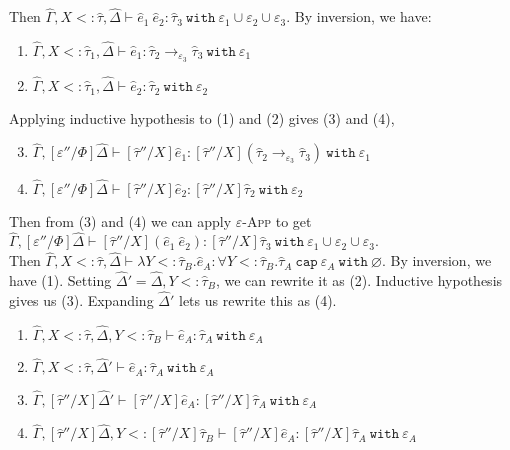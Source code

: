 \documentclass{llncs}
\newcommand{\keywadj}[1]{\mathtt{#1}}
\newcommand{\keyw}[1]{\keywadj{#1}~}
\newcommand{\kw}[1]{\keyw{ #1 }}
\begin{document}
 Then $\hat \Gamma, X <: \hat \tau, \hat \Delta \vdash \hat e_1~\hat e_2: \hat \tau_3~\kw{with} \varepsilon_1 \cup \varepsilon_2 \cup \varepsilon_3$. By inversion, we have:

\begin{enumerate}
	\item $\hat \Gamma, X <: \hat \tau_1, \hat \Delta \vdash \hat e_1: \hat \tau_2 \rightarrow_{\varepsilon_3} \hat \tau_3~\kw{with} \varepsilon_1$
	\item $\hat \Gamma, X <: \hat \tau_1, \hat \Delta \vdash \hat e_2: \hat \tau_2~\kw{with} \varepsilon_2$
\end{enumerate}

Applying inductive hypothesis to (1) and (2) gives (3) and (4),

\begin{enumerate}
	\setcounter{enumi}{2}
	\item $\hat \Gamma, [\varepsilon''/\Phi]\hat \Delta \vdash [\hat \tau''/X]\hat e_1: [\hat \tau''/X](\hat \tau_2 \rightarrow_{\varepsilon_3} \hat \tau_3)~\kw{with} \varepsilon_1$
	\item $\hat \Gamma, [\varepsilon''/\Phi]\hat \Delta \vdash [\hat \tau''/X]\hat e_2:  [\hat \tau''/X]\hat \tau_2~\kw{with} \varepsilon_2$
\end{enumerate}

Then from (3) and (4) we can apply \textsc{$\varepsilon$-App} to get $\hat \Gamma, [\varepsilon''/\Phi]\hat \Delta \vdash [\hat \tau''/X](\hat e_1~\hat e_2) : [\hat \tau''/X]\hat \tau_3~\kw{with} \varepsilon_1 \cup \varepsilon_2 \cup \varepsilon_3$. \\

 Then $\hat \Gamma, X <: \hat \tau, \hat \Delta \vdash \lambda Y <: \hat \tau_B. \hat e_A: \forall Y <: \hat \tau_B. \hat \tau_A~\kw{cap} \varepsilon_A~\kw{with} \varnothing$. By inversion, we have (1). Setting $\hat \Delta' = \hat \Delta, Y <: \hat \tau_B$, we can rewrite it as (2). Inductive hypothesis gives us (3). Expanding $\hat \Delta'$ lets us rewrite this as (4).

\begin{enumerate}
	\item $\hat \Gamma, X <: \hat \tau, \hat \Delta, Y <: \hat \tau_B \vdash \hat e_A: \hat \tau_A~\kw{with} \varepsilon_A$ 
	\item $\hat \Gamma, X <: \hat \tau, \hat \Delta' \vdash \hat e_A: \hat \tau_A~\kw{with} \varepsilon_A$
	\item $\hat \Gamma, [\hat \tau''/X]\hat \Delta' \vdash [\hat \tau''/X]\hat e_A: [\hat \tau''/X]\hat \tau_A~\kw{with} \varepsilon_A$
	\item $\hat \Gamma, [\hat \tau''/X]\hat \Delta, Y <: [\hat \tau''/X] \hat \tau_B \vdash [\hat \tau''/X]\hat e_A: [\hat \tau''/X]\hat \tau_A~\kw{with} \varepsilon_A$
\end{enumerate}
\end{document}

